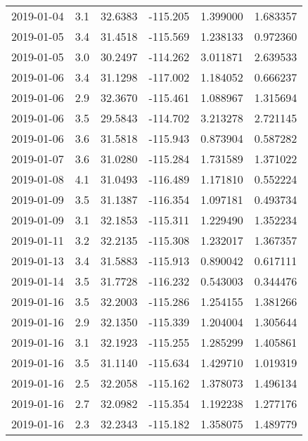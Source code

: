 \begin{tabular}{lrrrrr}
2019-01-04 &       3.1 &  32.6383 &  -115.205 &         1.399000 &         1.683357 \\
2019-01-05 &       3.4 &  31.4518 &  -115.569 &         1.238133 &         0.972360 \\
2019-01-05 &       3.0 &  30.2497 &  -114.262 &         3.011871 &         2.639533 \\
2019-01-06 &       3.4 &  31.1298 &  -117.002 &         1.184052 &         0.666237 \\
2019-01-06 &       2.9 &  32.3670 &  -115.461 &         1.088967 &         1.315694 \\
2019-01-06 &       3.5 &  29.5843 &  -114.702 &         3.213278 &         2.721145 \\
2019-01-06 &       3.6 &  31.5818 &  -115.943 &         0.873904 &         0.587282 \\
2019-01-07 &       3.6 &  31.0280 &  -115.284 &         1.731589 &         1.371022 \\
2019-01-08 &       4.1 &  31.0493 &  -116.489 &         1.171810 &         0.552224 \\
2019-01-09 &       3.5 &  31.1387 &  -116.354 &         1.097181 &         0.493734 \\
2019-01-09 &       3.1 &  32.1853 &  -115.311 &         1.229490 &         1.352234 \\
2019-01-11 &       3.2 &  32.2135 &  -115.308 &         1.232017 &         1.367357 \\
2019-01-13 &       3.4 &  31.5883 &  -115.913 &         0.890042 &         0.617111 \\
2019-01-14 &       3.5 &  31.7728 &  -116.232 &         0.543003 &         0.344476 \\
2019-01-16 &       3.5 &  32.2003 &  -115.286 &         1.254155 &         1.381266 \\
2019-01-16 &       2.9 &  32.1350 &  -115.339 &         1.204004 &         1.305644 \\
2019-01-16 &       3.1 &  32.1923 &  -115.255 &         1.285299 &         1.405861 \\
2019-01-16 &       3.5 &  31.1140 &  -115.634 &         1.429710 &         1.019319 \\
2019-01-16 &       2.5 &  32.2058 &  -115.162 &         1.378073 &         1.496134 \\
2019-01-16 &       2.7 &  32.0982 &  -115.354 &         1.192238 &         1.277176 \\
2019-01-16 &       2.3 &  32.2343 &  -115.182 &         1.358075 &         1.489779 \\

\end{tabular}
